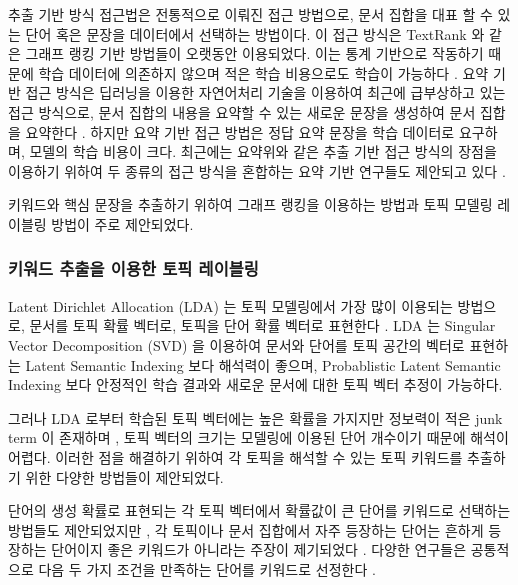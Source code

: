 \documentclass[11pt]{article}
\begin{document}
추출 기반 방식 접근법은 전통적으로 이뤄진 접근 방법으로, 문서 집합을 대표 할 수 있는 단어 혹은 문장을 데이터에서 선택하는 방법이다.
이 접근 방식은 TextRank \citep{mihalcea2004textrank} 와 같은 그래프 랭킹 기반 방법들이 오랫동안 이용되었다.
이는 통계 기반으로 작동하기 때문에 학습 데이터에 의존하지 않으며 적은 학습 비용으로도 학습이 가능하다 \citep{parveen2015topical, narayan2018ranking}.
요약 기반 접근 방식은 딥러닝을 이용한 자연어처리 기술을 이용하여 최근에 급부상하고 있는 접근 방식으로, 문서 집합의 내용을 요약할 수 있는 새로운 문장을 생성하여 문서 집합을 요약한다 \citep{nallapati2016abstractive}.
하지만 요약 기반 접근 방법은 정답 요약 문장을 학습 데이터로 요구하며, 모델의 학습 비용이 크다.
최근에는 요약위와 같은 추출 기반 접근 방식의 장점을 이용하기 위하여 두 종류의 접근 방식을 혼합하는 요약 기반 연구들도 제안되고 있다 \citep{banerjee2015multi, bing2015abstractive, gu2016incorporating}.

키워드와 핵심 문장을 추출하기 위하여 그래프 랭킹을 이용하는 방법과 토픽 모델링 레이블링 방법이 주로 제안되었다.

\subsubsection{키워드 추출을 이용한 토픽 레이블링}

Latent Dirichlet Allocation (LDA) 는 토픽 모델링에서 가장 많이 이용되는 방법으로, 문서를 토픽 확률 벡터로, 토픽을 단어 확률 벡터로 표현한다 \citep{blei2003latent}.
LDA 는 Singular Vector Decomposition (SVD) 을 이용하여 문서와 단어를 토픽 공간의 벡터로 표현하는 Latent Semantic Indexing \citep{landauer1998introduction} 보다 해석력이 좋으며, Probablistic Latent Semantic Indexing \citep{hofmann1999probabilistic} 보다 안정적인 학습 결과와 새로운 문서에 대한 토픽 벡터 추정이 가능하다.

그러나 LDA 로부터 학습된 토픽 벡터에는 높은 확률을 가지지만 정보력이 적은 junk term 이 존재하며 \citep{newman2010evaluating}, 토픽 벡터의 크기는 모델링에 이용된 단어 개수이기 때문에 해석이 어렵다.
이러한 점을 해결하기 위하여 각 토픽을 해석할 수 있는 토픽 키워드를 추출하기 위한 다양한 방법들이 제안되었다. 

단어의 생성 확률로 표현되는 각 토픽 벡터에서 확률값이 큰 단어를 키워드로 선택하는 방법들도 제안되었지만 \citep{snyder2013topic, chuang2013topic, wallach2009evaluation}, 각 토픽이나 문서 집합에서 자주 등장하는 단어는 흔하게 등장하는 단어이지 좋은 키워드가 아니라는 주장이 제기되었다 \citep{ramage09tmsocial, newman2010evaluating, chuang2012interpretation}.
다양한 연구들은 공통적으로 다음 두 가지 조건을 만족하는 단어를 키워드로 선정한다 \citep{chuang2012termite}.
\end{document}

